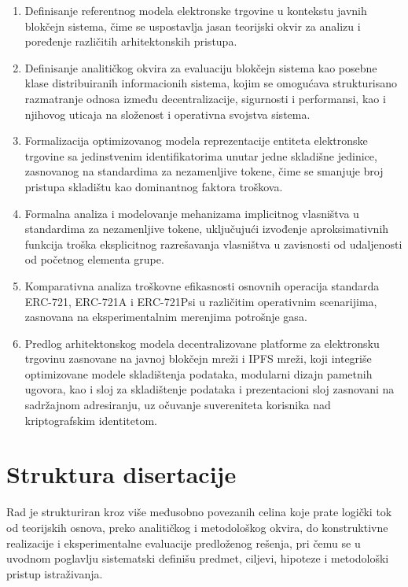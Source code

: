 \begin{enumerate}
\item Definisanje referentnog modela elektronske trgovine u kontekstu javnih blokčejn sistema, čime se uspostavlja jasan teorijski okvir za analizu i poređenje različitih arhitektonskih pristupa.
\item Definisanje analitičkog okvira za evaluaciju blokčejn sistema kao posebne klase distribuiranih informacionih sistema, kojim se omogućava strukturisano razmatranje odnosa između decentralizacije, sigurnosti i performansi, kao i njihovog uticaja na složenost i operativna svojstva sistema.
\item Formalizacija optimizovanog modela reprezentacije entiteta elektronske trgovine sa jedinstvenim identifikatorima unutar jedne skladišne jedinice, zasnovanog na standardima za nezamenljive tokene, čime se smanjuje broj pristupa skladištu kao dominantnog faktora troškova.
\item Formalna analiza i modelovanje mehanizama implicitnog vlasništva u standardima za nezamenljive tokene, uključujući izvođenje aproksimativnih funkcija troška eksplicitnog razrešavanja vlasništva u zavisnosti od udaljenosti od početnog elementa grupe.
\item Komparativna analiza troškovne efikasnosti osnovnih operacija standarda ERC-721, ERC-721A i ERC-721Psi u različitim operativnim scenarijima, zasnovana na eksperimentalnim merenjima potrošnje gasa.
\item Predlog arhitektonskog modela decentralizovane platforme za elektronsku trgovinu zasnovane na javnoj blokčejn mreži i IPFS mreži, koji integriše optimizovane modele skladištenja podataka, modularni dizajn pametnih ugovora, kao i sloj za skladištenje podataka i prezentacioni sloj zasnovani na sadržajnom adresiranju, uz očuvanje suvereniteta korisnika nad kriptografskim identitetom.
\end{enumerate}

\section{Struktura disertacije}
Rad je strukturiran kroz više međusobno povezanih celina koje prate logički tok od teorijskih osnova, preko analitičkog i metodološkog okvira, do konstruktivne realizacije i eksperimentalne evaluacije predloženog rešenja, pri čemu se u uvodnom poglavlju sistematski definišu predmet, ciljevi, hipoteze i metodološki pristup istraživanja.

